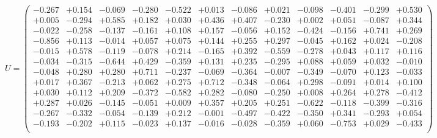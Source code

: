 \documentclass[9pt]{article}
\theoremstyle{plain}
\theoremstyle{definition}
\theoremstyle{remark}
\numberwithin{equation}{section}
\begin{document}
$U = \left(
\begin{array}{
cccccccccccc}
-0.267 & +0.154 & -0.069 & -0.280 & -0.522 & +0.013 & -0.086 & +0.021 & -0.098 & -0.401 & -0.299 & +0.530 \\
+0.005 & -0.294 & +0.585 & +0.182 & +0.030 & +0.436 & +0.407 & -0.230 & +0.002 & +0.051 & -0.087 & +0.344 \\
-0.022 & -0.258 & -0.137 & -0.161 & +0.108 & +0.157 & -0.056 & +0.152 & -0.424 & -0.156 & +0.741 & +0.269 \\
-0.856 & +0.113 & -0.014 & +0.057 & +0.075 & +0.144 & +0.255 & +0.297 & -0.045 & +0.162 & +0.024 & -0.208 \\
-0.015 & +0.578 & -0.119 & -0.078 & +0.214 & -0.165 & +0.392 & -0.559 & -0.278 & +0.043 & +0.117 & +0.116 \\
-0.034 & -0.315 & -0.644 & +0.429 & -0.359 & +0.131 & +0.235 & -0.295 & +0.088 & +0.059 & +0.032 & -0.010 \\
-0.048 & +0.280 & +0.280 & +0.711 & -0.237 & -0.069 & -0.364 & -0.007 & -0.349 & -0.070 & +0.123 & -0.033 \\
+0.017 & +0.367 & -0.213 & +0.062 & +0.275 & +0.712 & -0.348 & -0.064 & +0.298 & -0.091 & +0.014 & +0.100 \\
+0.030 & +0.112 & +0.209 & -0.372 & -0.582 & +0.282 & -0.080 & -0.250 & +0.008 & +0.264 & +0.278 & -0.412 \\
+0.287 & +0.026 & -0.145 & -0.051 & +0.009 & +0.357 & +0.205 & +0.251 & -0.622 & -0.118 & -0.399 & -0.316 \\
-0.267 & -0.332 & -0.054 & -0.139 & +0.212 & -0.001 & -0.497 & -0.422 & -0.350 & +0.341 & -0.293 & +0.054 \\
-0.193 & -0.202 & +0.115 & -0.023 & +0.137 & -0.016 & -0.028 & -0.359 & +0.060 & -0.753 & +0.029 & -0.433 \\
\end{array}
\right)$ \newline 
\end{document}

